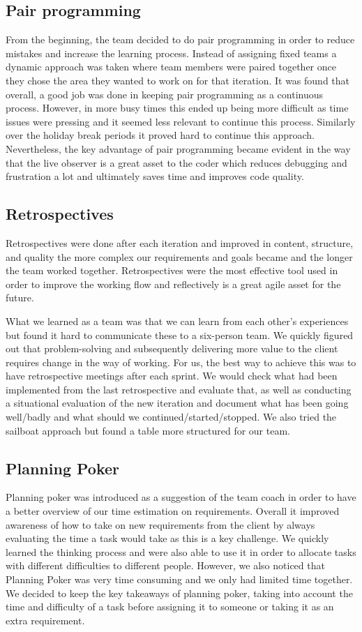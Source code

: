 \documentclass{l3proj}
\begin{document}
\subsection{Pair programming}
From the beginning, the team decided to do pair programming in order to reduce mistakes and increase the learning process. Instead of assigning fixed teams a dynamic approach was taken where team members were paired together once they chose the area they wanted to work on for that iteration. It was found that overall, a good job was done in keeping pair programming as a continuous process. However, in more busy times this ended up being more difficult as time issues were pressing and it seemed less relevant to continue this process. Similarly over the holiday break periods it proved hard to continue this approach. Nevertheless, the key advantage of pair programming became evident in the way that the live observer is a great asset to the coder which reduces debugging and frustration a lot and ultimately saves time and improves code quality.

\subsection{Retrospectives }
Retrospectives were done after each iteration and improved in content, structure, and quality the more complex our requirements and goals became and the longer the team worked together. Retrospectives were the most effective tool used in order to improve the working flow and reflectively is a great agile asset for the future.  

What we learned as a team was that we can learn from each other’s experiences but found it hard to communicate these to a six-person team. We quickly figured out that problem-solving and subsequently delivering more value to the client requires change in the way of working.  For us, the best way to achieve this was to have retrospective meetings after each sprint. We would check what had been implemented from the last retrospective and evaluate that, as well as conducting a situational evaluation of the new iteration and document what has been going well/badly and what should we continued/started/stopped. We also tried the sailboat approach but found a table more structured for our team.

\subsection{Planning Poker}
Planning poker was introduced as a suggestion of the team coach in order to have a better overview of our time estimation on requirements. Overall it improved awareness of how to take on new requirements from the client by always evaluating the time a task would take as this is a key challenge. We quickly learned the thinking process and were also able to use it in order to allocate tasks with different difficulties to different people. However, we also noticed that Planning Poker was very time consuming and we only had limited time together. We decided to keep the key takeaways of planning poker, taking into account the time and difficulty of a task before assigning it to someone or taking it as an extra requirement.
\end{document}
